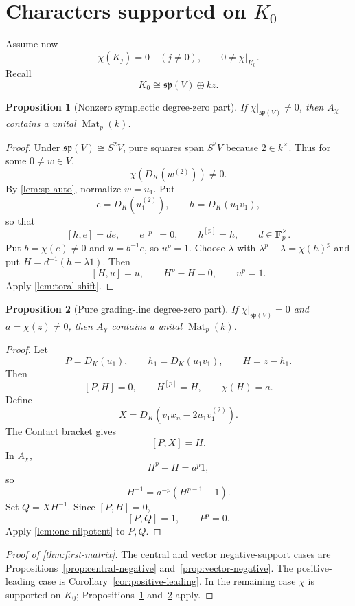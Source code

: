 \documentclass[11pt,reqno]{amsart}
\newtheorem{proposition}[proposition]{Proposition}
\theoremstyle{definition}
\theoremstyle{remark}
\theoremstyle{definition}
\newcommand{\Achi}{A_{\chi}}
\newcommand{\Mat}{\operatorname{Mat}}
\newcommand{\Fp}{\mathbf F_p}
\begin{document}
\section{Characters supported on \texorpdfstring{$K_0$}{K0}}\label{sec:k0}

Assume now
\[
 \chi(K_j)=0\quad(j\ne0),
 \qquad 0\ne\chi|_{K_0}.
\]
Recall
\[
 K_0\cong\mathfrak{sp}(V)\oplus kz.
\]

\begin{proposition}[Nonzero symplectic degree-zero part]\label{prop:k0-sp}
If $\chi|_{\mathfrak{sp}(V)}\ne0$, then $\Achi$ contains a unital
$\Mat_p(k)$.
\end{proposition}

\begin{proof}
Under $\mathfrak{sp}(V)\cong S^2V$, pure squares span $S^2V$ because
$2\in k^\times$.  Thus for some $0\ne w\in V$,
\[
 \chi(D_K(w^{(2)}))\ne0.
\]
By \cref{lem:sp-auto}, normalize $w=u_1$.  Put
\[
 e=D_K(u_1^{(2)}),\qquad h=D_K(u_1v_1),
\]
so that
\[
 [h,e]=de,
 \qquad e^{[p]}=0,
 \qquad h^{[p]}=h,
 \qquad d\in\Fp^\times.
\]
Put $b=\chi(e)\ne0$ and $u=b^{-1}e$, so $u^p=1$.  Choose
$\lambda$ with $\lambda^p-\lambda=\chi(h)^p$ and put
$H=d^{-1}(h-\lambda1)$.  Then
\[
 [H,u]=u,
 \qquad H^p-H=0,
 \qquad u^p=1.
\]
Apply \cref{lem:toral-shift}.
\end{proof}

\begin{proposition}[Pure grading-line degree-zero part]\label{prop:k0-z}
If $\chi|_{\mathfrak{sp}(V)}=0$ and $a=\chi(z)\ne0$, then $\Achi$
contains a unital $\Mat_p(k)$.
\end{proposition}

\begin{proof}
Let
\[
 P=D_K(u_1),
 \qquad h_1=D_K(u_1v_1),
 \qquad H=z-h_1.
\]
Then
\[
 [P,H]=0,
 \qquad H^{[p]}=H,
 \qquad \chi(H)=a.
\]
Define
\[
 X=D_K(v_1x_n-2u_1v_1^{(2)}).
\]
The Contact bracket gives
\[
 [P,X]=H.
\]
In $\Achi$,
\[
 H^p-H=a^p1,
\]
so
\[
 H^{-1}=a^{-p}(H^{p-1}-1).
\]
Set $Q=XH^{-1}$.  Since $[P,H]=0$,
\[
 [P,Q]=1,
 \qquad P^p=0.
\]
Apply \cref{lem:one-nilpotent} to $P,Q$.
\end{proof}

\begin{proof}[Proof of \cref{thm:first-matrix}]
The central and vector negative-support cases are
Propositions~\ref{prop:central-negative} and~\ref{prop:vector-negative}.
The positive-leading case is Corollary~\ref{cor:positive-leading}.  In the
remaining case $\chi$ is supported on $K_0$; Propositions~\ref{prop:k0-sp}
and~\ref{prop:k0-z} apply.
\end{proof}
\end{document}
